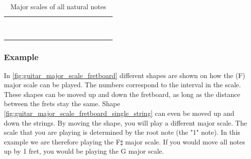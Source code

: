 \begin{table}[h]
	\centering
	\begin{NiceTabular}{*{16}{P{0.05mm}}}
		\Block{}{} &  & &  & &  & &  & &  & &  & &  & & \Block{}{} \\
		 & &  & &  & &  & &  & &  & &  & &  & \\
		 & &  & &  & &  & &  & &  & &  & &  & \\
		 & &  & &  & &  & &  & &  & &  & &  & \\
		 & &  & &  & &  & &  & &  & &  & &  & \\
		 & &  & &  & &  & &  & &  & &  & &  & \\
		 & &  & &  & &  & &  & &  & &  & &  & \\
		 & &  & &  & &  & &  & &  & &  & &  & \\
		 & &  & &  & &  & &  & &  & &  & &  & 
	\end{NiceTabular}
	\caption{Major scales of all natural notes}
	\label{tab:guitar_natural_note_major_scale}
\end{table}

\newpage

\subsubsection{Example}

In \autoref{fig:guitar_major_scale_fretboard} different shapes are shown on how the (F\sharp) major scale can be played. The numbers correspond to the interval in the scale. These shapes can be moved up and down the fretboard, as long as the distance between the frets stay the same. Shape \autoref{fig:guitar_major_scale_fretboard_single_string} can even be moved up and down the strings. By moving the shape, you will play a different major scale. The scale that you are playing is determined by the root note (the "1" note). In this example we are therefore playing the F$\sharp$ major scale. If you would move all notes up by 1 fret, you would be playing the G major scale.


